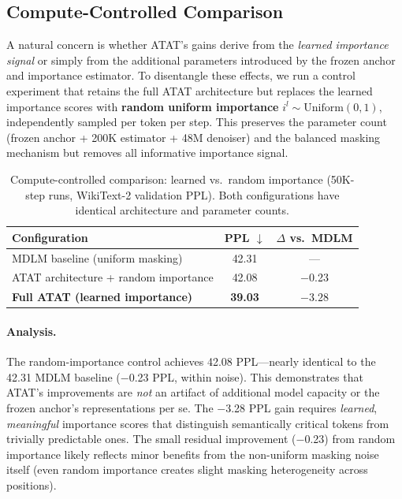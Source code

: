 \subsection{Compute-Controlled Comparison}

A natural concern is whether ATAT's gains derive from the \emph{learned importance signal} or simply from the additional parameters introduced by the frozen anchor and importance estimator. To disentangle these effects, we run a control experiment that retains the full ATAT architecture but replaces the learned importance scores with \textbf{random uniform importance} $i^l \sim \text{Uniform}(0, 1)$, independently sampled per token per step. This preserves the parameter count (frozen anchor + 200K estimator + 48M denoiser) and the balanced masking mechanism but removes all informative importance signal.

\begin{table}[h]
\centering
\caption{Compute-controlled comparison: learned vs.\ random importance (50K-step runs, WikiText-2 validation PPL). Both configurations have identical architecture and parameter counts.}
\label{tab:compute-control}
\begin{tabular}{lcc}
\toprule
\textbf{Configuration} & \textbf{PPL} $\downarrow$ & \textbf{$\Delta$ vs.\ MDLM} \\
\midrule
MDLM baseline (uniform masking) & 42.31 & --- \\
ATAT architecture + random importance & 42.08 & $-$0.23 \\
\textbf{Full ATAT (learned importance)} & \textbf{39.03} & $\mathbf{-3.28}$ \\
\bottomrule
\end{tabular}
\end{table}

\paragraph{Analysis.} The random-importance control achieves 42.08 PPL---nearly identical to the 42.31 MDLM baseline ($-$0.23 PPL, within noise). This demonstrates that ATAT's improvements are \emph{not} an artifact of additional model capacity or the frozen anchor's representations per se. The $-$3.28 PPL gain requires \emph{learned}, \emph{meaningful} importance scores that distinguish semantically critical tokens from trivially predictable ones. The small residual improvement ($-$0.23) from random importance likely reflects minor benefits from the non-uniform masking noise itself (even random importance creates slight masking heterogeneity across positions).

